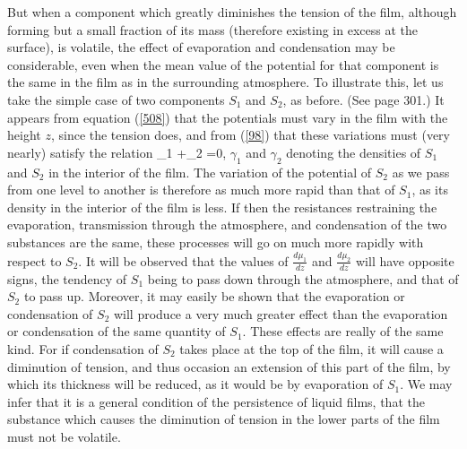 \documentclass[12pt]{article}
\begin{document}
But when a component which greatly diminishes the tension of the film, although forming but a small fraction of its mass (therefore existing in excess at the surface), is volatile, the effect of evaporation and condensation may be considerable, even when the mean value of the potential for that component is the same in the film as in the surrounding atmosphere. To illustrate this, let us take the simple case of two components $S_1$ and $S_2$, as before. (See page 301.) It appears from equation (\ref{508}) that the potentials must vary in the film with the height $z$, since the tension does, and from (\ref{98}) that these variations must (very nearly) satisfy the relation
\eqs \gamma_1   +\gamma_2  =0,   \label{658} \eqe
$\gamma_1$ and $\gamma_2$ denoting the densities of $S_1$ and $S_2$ in the interior of the film. The variation of the potential of $S_2$ as we pass from one level to another is therefore as much more rapid than that of $S_1$, as its density in the interior of the film is less. If then the resistances restraining the evaporation, transmission through the atmosphere, and condensation of the two substances are the same, these processes will go on much more rapidly with respect to $S_2$. It will be observed that the values of $\frac{d\mu_1}{dz}$ and $\frac{d\mu_2}{dz}$ will have opposite signs, the tendency of $S_1$ being to pass down through the atmosphere, and that of $S_2$ to pass up. Moreover, it may easily be shown that the evaporation or condensation of $S_2$ will produce a very much greater effect than the evaporation or condensation of the same quantity of $S_1$. These effects are really of the same kind. For if condensation of $S_2$ takes place at the top of the film, it will cause a diminution of tension, and thus occasion an extension of this part of the film, by which its thickness will be reduced, as it would be by evaporation of $S_1$. We may infer that it is a general condition of the persistence of liquid films, that the substance which causes the diminution of tension in the lower parts of the film must not be volatile.
\end{document}
